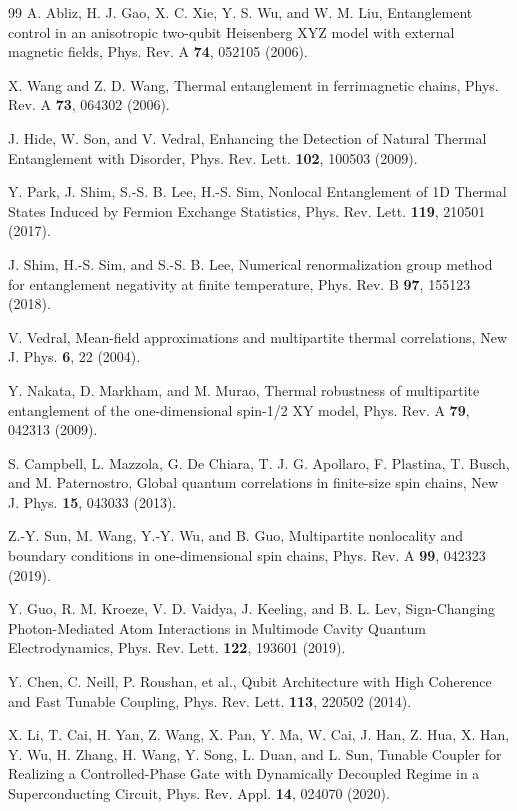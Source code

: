 \documentclass[pra,aps,twocolumn,showpacs]{revtex4}
\begin{document}
\begin{thebibliography}{99}
  A. Abliz, H. J. Gao, X. C. Xie, Y. S. Wu, and W. M. Liu, Entanglement control in an anisotropic two-qubit Heisenberg XYZ model with external magnetic fields, Phys. Rev. A \textbf{74}, 052105 (2006).

   X. Wang and Z. D. Wang, Thermal entanglement in ferrimagnetic chains, Phys. Rev. A \textbf{73}, 064302 (2006).

  J. Hide, W. Son, and V. Vedral, Enhancing the Detection of Natural Thermal Entanglement with Disorder, Phys. Rev. Lett. \textbf{102}, 100503 (2009).

  Y. Park, J. Shim, S.-S. B. Lee, H.-S. Sim, Nonlocal Entanglement of 1D Thermal States Induced by Fermion Exchange Statistics, Phys. Rev. Lett. \textbf{119}, 210501 (2017).

 J. Shim, H.-S. Sim, and S.-S. B. Lee, Numerical renormalization group method for entanglement negativity at finite temperature, Phys. Rev. B \textbf{97}, 155123 (2018).

 V. Vedral, Mean-field approximations and multipartite thermal correlations, New J. Phys. \textbf{6}, 22 (2004).

 Y. Nakata, D. Markham, and M. Murao, Thermal robustness of multipartite entanglement of the one-dimensional spin-1/2 XY model, Phys. Rev. A \textbf{79}, 042313 (2009).

 S. Campbell, L. Mazzola, G. De Chiara, T. J. G. Apollaro, F. Plastina, T. Busch, and M. Paternostro, Global quantum correlations in finite-size spin chains, New J. Phys. \textbf{15}, 043033 (2013).


 Z.-Y. Sun, M. Wang, Y.-Y. Wu, and B. Guo, Multipartite nonlocality and boundary conditions in one-dimensional spin chains, Phys. Rev. A \textbf{99}, 042323 (2019).


 Y. Guo, R. M. Kroeze, V. D. Vaidya, J. Keeling, and B. L. Lev, Sign-Changing Photon-Mediated Atom Interactions in Multimode Cavity Quantum Electrodynamics, Phys. Rev. Lett. \textbf{122}, 193601 (2019).

  Y. Chen, C. Neill, P. Roushan, et al., Qubit Architecture with High Coherence and Fast Tunable Coupling, Phys. Rev. Lett. \textbf{113}, 220502 (2014).

 X. Li, T. Cai, H. Yan, Z. Wang, X. Pan, Y. Ma, W. Cai, J. Han, Z. Hua, X. Han, Y. Wu, H. Zhang, H. Wang, Y. Song, L. Duan, and L. Sun, Tunable Coupler for Realizing a Controlled-Phase Gate with Dynamically Decoupled Regime in a Superconducting Circuit, Phys. Rev. Appl. \textbf{14}, 024070 (2020).


\end{thebibliography}
\end{document}
